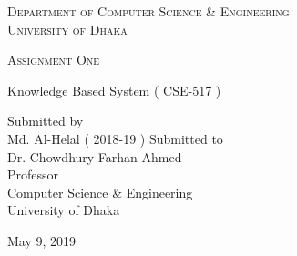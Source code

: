 \documentclass[a4paper,12pt]{article}
\begin{document}
\begin{titlepage}
\centering
{\scshape\LARGE Department of Computer Science \& Engineering\\University of Dhaka \par}
\vspace{1.5cm}
{\scshape\Large Assignment One\par}
\vfill
{\Large Knowledge Based System ( CSE-517 )\par}
\vspace{2cm}
{\Large Submitted by\\
\vspace{0.5cm}
 \centering Md. Al-Helal ( 2018-19 )}
\vfill
{\Large Submitted to\\
\vspace{0.5cm}
 Dr. Chowdhury Farhan Ahmed\\ Professor\\Computer Science \& Engineering\\University of Dhaka}
\vfill
{\large May 9, 2019\par}
\end{titlepage}
\end{document}
